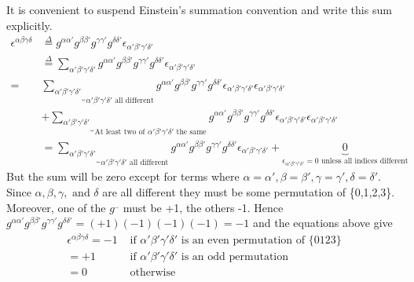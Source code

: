 \documentclass[10pt,a4paper]{article}
\begin{document}
	It is convenient to suspend Einstein's summation convention and write this sum explicitly.
	\begin{align*}
		\epsilon^{\alpha\beta\gamma\delta}&\overset{\Delta}{=}g^{\alpha\alpha'}g^{\beta\beta'}g^{\gamma\gamma'}g^{\delta\delta'}\epsilon_{\alpha'\beta'\gamma'\delta'}\\
		&\overset{\Delta}{=}\sum_{\alpha'\beta'\gamma'\delta'}g^{\alpha\alpha'}g^{\beta\beta'}g^{\gamma\gamma'}g^{\delta\delta'}\epsilon_{\alpha'\beta'\gamma'\delta'} \\
	 = &\underbrace{\sum_{\alpha'\beta'\gamma'\delta'}}_{\text{$\alpha'\beta'\gamma'\delta'$ all different}}g^{\alpha\alpha'}g^{\beta\beta'}g^{\gamma\gamma'}g^{\delta\delta'}\epsilon_{\alpha'\beta'\gamma'\delta'}\epsilon_{\alpha'\beta'\gamma'\delta'}\\
	  &+ \underbrace{\sum_{\alpha'\beta'\gamma'\delta'}}_{\text{At least two of $\alpha'\beta'\gamma'\delta'$ the same}}g^{\alpha\alpha'}g^{\beta\beta'}g^{\gamma\gamma'}g^{\delta\delta'}\epsilon_{\alpha'\beta'\gamma'\delta'}\epsilon_{\alpha'\beta'\gamma'\delta'}\\
	 &= \underbrace{\sum_{\alpha'\beta'\gamma'\delta'}}_{\text{$\alpha'\beta'\gamma'\delta'$ all different}}g^{\alpha\alpha'}g^{\beta\beta'}g^{\gamma\gamma'}g^{\delta\delta'}\epsilon_{\alpha'\beta'\gamma'\delta'} + \underbrace{0}_{\text{$\epsilon_{\alpha'\beta'\gamma'\delta'}=0$ unless all indices different}}
	\end{align*}
	But the sum will be zero except for terms where $\alpha=\alpha',\beta=\beta',\gamma=\gamma',\delta=\delta'$. Since $\alpha, \beta, \gamma, \text { and } \delta$ are all different they must be some permutation of \{0,1,2,3\}. Moreover, one of the $g^{..}$ must be +1, the others -1. Hence $g^{\alpha\alpha'}g^{\beta\beta'}g^{\gamma\gamma'}g^{\delta\delta'}=(+1)(-1)(-1)(-1)=-1$
	and the equations above give 
	\begin{align}
	\epsilon^{\alpha\beta\gamma\delta} = -1&\text{ if $\alpha'\beta'\gamma'\delta'$ is an even permutation of \{0123\}} \\
	= +1&\text { if $\alpha'\beta'\gamma'\delta'$  is an odd permutation}\\
	= 0&\text { otherwise}
	\end{align}
\end{document}
